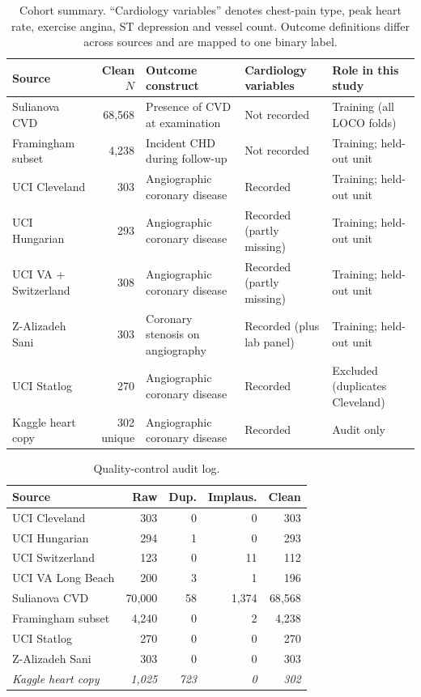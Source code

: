 \documentclass[conference]{IEEEtran}
\begin{document}
\begin{table}[t]
\caption{Cohort summary. ``Cardiology variables'' denotes chest-pain type, peak heart rate, exercise angina, ST depression and vessel count. Outcome definitions differ across sources and are mapped to one binary label.}
\label{tab:cohorts}
\centering\footnotesize
\begin{tabular}{p{3.2cm}rp{4.6cm}p{2.9cm}p{3.6cm}}
\toprule
Source & Clean $N$ & Outcome construct & Cardiology variables & Role in this study\\
\midrule
Sulianova CVD & 68{,}568 & Presence of CVD at examination & Not recorded & Training (all LOCO folds)\\
Framingham subset & 4{,}238 & Incident CHD during follow-up & Not recorded & Training; held-out unit\\
UCI Cleveland & 303 & Angiographic coronary disease & Recorded & Training; held-out unit\\
UCI Hungarian & 293 & Angiographic coronary disease & Recorded (partly missing) & Training; held-out unit\\
UCI VA + Switzerland & 308 & Angiographic coronary disease & Recorded (partly missing) & Training; held-out unit\\
Z-Alizadeh Sani & 303 & Coronary stenosis on angiography & Recorded (plus lab panel) & Training; held-out unit\\
UCI Statlog & 270 & Angiographic coronary disease & Recorded & Excluded (duplicates Cleveland)\\
Kaggle heart copy & 302 unique & Angiographic coronary disease & Recorded & Audit only\\
\bottomrule
\end{tabular}
\end{table}

\begin{table}[t]
\caption{Quality-control audit log.}
\label{tab:audit}
\centering\footnotesize
\begin{tabular}{lrrrr}
\toprule
Source & Raw & Dup. & Implaus. & Clean\\
\midrule
UCI Cleveland & 303 & 0 & 0 & 303\\
UCI Hungarian & 294 & 1 & 0 & 293\\
UCI Switzerland & 123 & 0 & 11 & 112\\
UCI VA Long Beach & 200 & 3 & 1 & 196\\
Sulianova CVD & 70{,}000 & 58 & 1{,}374 & 68{,}568\\
Framingham subset & 4{,}240 & 0 & 2 & 4{,}238\\
UCI Statlog & 270 & 0 & 0 & 270\\
Z-Alizadeh Sani & 303 & 0 & 0 & 303\\
\midrule
\emph{Kaggle heart copy} & \emph{1{,}025} & \emph{723} & \emph{0} & \emph{302}\\
\bottomrule
\end{tabular}
\end{table}
\end{document}
